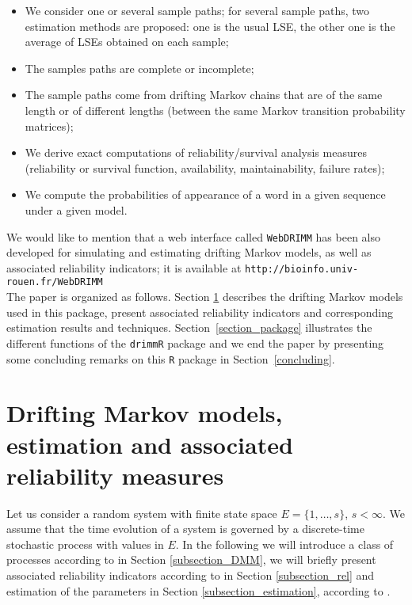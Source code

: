 \documentclass[article,nojss]{jss}\usepackage[]{graphicx}\usepackage[]{color}
\begin{document}
\begin{itemize}
\item We consider one or several sample paths; for several sample paths, two estimation methods are proposed: one is the usual LSE, the other one is the average of LSEs obtained on each sample;
\item The samples paths are complete or incomplete;
\item The sample paths come from drifting Markov chains that are of the same length or of different lengths (between the same Markov transition probability matrices);
\item We derive exact computations of reliability/survival analysis measures (reliability or survival function, availability, maintainability, failure rates);
\item We compute the  probabilities of appearance of a word in a given sequence under a given model.
\end{itemize}

We would like to mention that a web interface called {\tt WebDRIMM} has been also developed \citep[cf.][]{web2018} for simulating and estimating drifting Markov models, as well as associated reliability indicators; it is available at \verb|http://bioinfo.univ-rouen.fr/WebDRIMM|\\

The paper is organized as follows. Section \ref{section_DMM} describes the drifting Markov models used in this package, present associated reliability indicators and corresponding estimation results and techniques. Section~\ref{section_package} illustrates the different functions of the {\tt drimmR} package and we end the paper by presenting some concluding remarks on this {\tt R} package in Section~\ref{concluding}.

\section{Drifting Markov models, estimation and associated reliability measures} \label{section_DMM}

Let us consider a random system with finite state space $E=\{1,\ldots, s\}$, $s < \infty.$ We assume that the time evolution of a system is governed by a discrete-time stochastic process with values in $E.$ In the following we will introduce a class of processes according to \citet{Ver08}  in Section \ref{subsection_DMM}, we will briefly present associated reliability indicators  according to \citet{BaVe2018} in Section \ref{subsection_rel} and estimation of the parameters in Section \ref{subsection_estimation}, according to \citet{Ver08,BaVe2018}.
\end{document}
